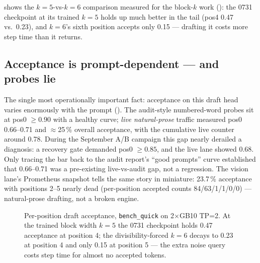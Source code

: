  shows the $k{=}5$-vs-$k{=}6$ comparison measured
for the block-$k$ work (): the 0731
checkpoint at its trained $k{=}5$ holds up much better in the tail
(pos4 0.47 vs.\ 0.23), and $k{=}6$'s sixth position accepts only 0.15 ---
drafting it costs more step time than it returns.

\subsection{Acceptance is prompt-dependent --- and probes lie}

The single most operationally important fact: acceptance on this draft head
varies enormously with the prompt ().
The audit-style numbered-word probes sit
at pos0 $\ge 0.90$ with a healthy curve; \emph{live natural-prose} traffic
measured pos0 0.66--0.71 and $\approx$25\,\% overall acceptance, with the
cumulative live counter around 0.78. During the September A/B campaign this
gap nearly derailed a diagnosis: a recovery gate demanded pos0 $\ge 0.85$,
and the live lane showed 0.68. Only tracing the bar back to the audit
report's ``good prompts'' curve established that 0.66--0.71 was a
pre-existing live-vs-audit gap, not a regression. The vision lane's
Prometheus snapshot tells the same story in miniature: 23.7\,\% acceptance
with positions 2--5 nearly dead (per-position accepted counts
84/63/1/1/0/0) --- natural-prose drafting, not a broken engine.

\begin{figure}[htbp]
\centering
{}
\caption{Per-position draft acceptance, \texttt{bench\_quick} on
2$\times$GB10 TP=2. At the trained block width $k{=}5$ the 0731 checkpoint
holds 0.47 acceptance at position 4; the divisibility-forced $k{=}6$ decays
to 0.23 at position 4 and only 0.15 at position 5 --- the extra noise query
costs step time for almost no accepted tokens.}
\label{fig:specdecode-curve}
\end{figure}

